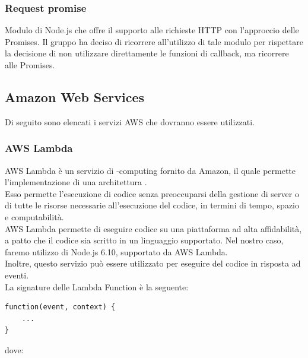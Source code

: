 \subsubsection{Request promise}
Modulo di Node.js che offre il supporto alle richieste HTTP con l'approccio delle Promises. Il gruppo ha deciso di ricorrere all'utilizzo di tale modulo per rispettare la decisione di non utilizzare direttamente le funzioni di callback, ma ricorrere alle Promises.
\newpage
\subsection{Amazon Web Services}
Di seguito sono elencati i servizi AWS che dovranno essere utilizzati.

\subsubsection{AWS Lambda}
AWS Lambda è un servizio di -computing fornito da Amazon, il quale permette l'implementazione di una architettura . \\
Esso permette l'esecuzione di codice senza preoccuparsi della gestione di server o di tutte le risorse necessarie all'esecuzione del codice, in termini di tempo, spazio e computabilità. \\
AWS Lambda permette di eseguire codice su una piattaforma ad alta affidabilità, a patto che il codice sia scritto in un linguaggio supportato. Nel nostro caso, faremo utilizzo di Node.js 6.10, supportato da AWS Lambda. \\
Inoltre, questo servizio può essere utilizzato per eseguire del codice in risposta ad eventi. \\
La signature delle Lambda Function è la seguente:
\begin{verbatim}
function(event, context) {
    ...
}
\end{verbatim}
dove:
